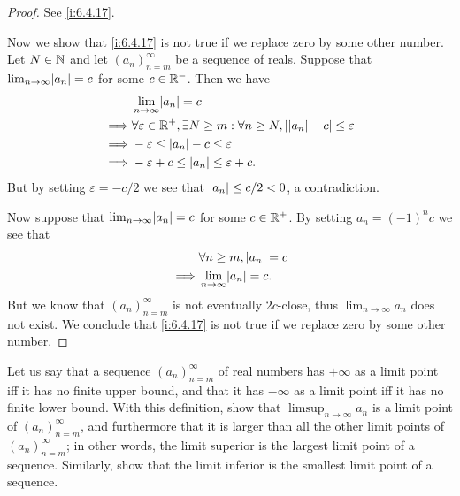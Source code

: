 \begin{proof}
  See \cref{i:6.4.17}.

  Now we show that \cref{i:6.4.17} is not true if we replace zero by some other number.
  Let \(N \in \mathbb{N}\) and let \((a_n)_{n = m}^\infty\) be a sequence of reals.
  Suppose that \(\lim_{n \to \infty} \abs{a_n} = c\) for some \(c \in \mathbb{R}^-\).
  Then we have
  \begin{align*}
             & \lim_{n \to \infty} \abs{a_n} = c                                                                       \\
    \implies & \forall \varepsilon \in \R^+, \exists N \geq m : \forall n \geq N, \abs{\abs{a_n} - c} \leq \varepsilon \\
    \implies & -\varepsilon \leq \abs{a_n} - c \leq \varepsilon                                                        \\
    \implies & -\varepsilon + c \leq \abs{a_n} \leq \varepsilon + c.
  \end{align*}
  But by setting \(\varepsilon = -c / 2\) we see that \(\left\lvert a_n\right\rvert \leq c / 2 < 0\), a contradiction.

  Now suppose that \(\lim_{n \to \infty} \abs{a_n} = c\) for some \(c \in \mathbb{R}^+\).
  By setting \(a_n = (-1)^n c\) we see that
  \begin{align*}
             & \forall n \geq m, \abs{a_n} = c    \\
    \implies & \lim_{n \to \infty} \abs{a_n} = c.
  \end{align*}
  But we know that \((a_n)_{n = m}^\infty\) is not eventually \(2c\)-close, thus \(\lim_{n \to \infty} a_n\) does not exist.
  We conclude that \cref{i:6.4.17} is not true if we replace zero by some other number.
\end{proof}

\begin{ex}\label{i:ex:6.4.8}
  Let us say that a sequence \((a_n)_{n = m}^\infty\) of real numbers has \(+\infty\) as a limit point iff it has no finite upper bound, and that it has \(-\infty\) as a limit point iff it has no finite lower bound.
  With this definition, show that \(\limsup_{n \to \infty} a_n\) is a limit point of \((a_n)_{n = m}^\infty\), and furthermore that it is larger than all the other limit points of \((a_n)_{n = m}^\infty\);
  in other words, the limit superior is the largest limit point of a sequence.
  Similarly, show that the limit inferior is the smallest limit point of a sequence.
\end{ex}

